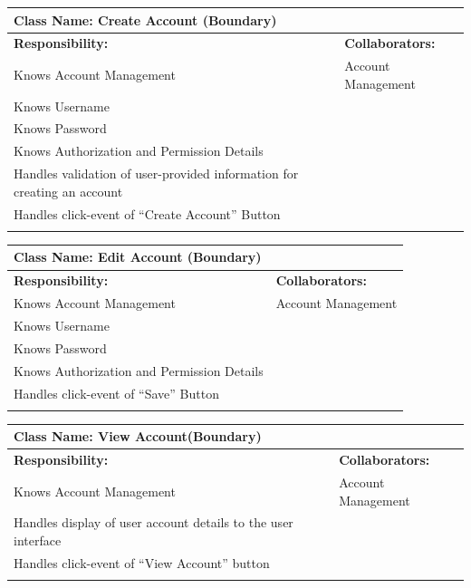 \documentclass[]{article}
\begin{document}
\begin{itemize}
	\begin{table}[ht]
		\centering
		\begin{tabular}{|p{7cm}|p{7cm}|}
		\hline 
		 \multicolumn{2}{|l|}{\textbf{Class Name:} Create Account (Boundary)} \\
		\hline
		\textbf{Responsibility:} & \textbf{Collaborators:} \\
		\hline
			Knows Account Management  & Account Management\\
			Knows Username &\\
			Knows Password &\\
			Knows Authorization and Permission Details &\\
			Handles validation of user-provided information for creating an account &\\
			Handles click-event of “Create Account” Button &\\
		\vspace{0.1in} & \\
		\hline
		\end{tabular}
	\end{table}

	\begin{table}[ht]
		\centering
		\begin{tabular}{|p{7cm}|p{7cm}|}
		\hline 
		 \multicolumn{2}{|l|}{\textbf{Class Name:} Edit Account (Boundary)} \\
		\hline
		\textbf{Responsibility:} & \textbf{Collaborators:} \\
		\hline
			Knows Account Management & Account Management\\
			Knows Username &\\
			Knows Password &\\
			Knows Authorization and Permission Details &\\
			Handles click-event of “Save” Button &\\
		\vspace{0.1in} & \\
		\hline
		\end{tabular}
	\end{table}

	\begin{table}[ht]
		\centering
		\begin{tabular}{|p{7cm}|p{7cm}|}
		\hline 
		 \multicolumn{2}{|l|}{\textbf{Class Name:} View Account(Boundary)} \\
		\hline
		\textbf{Responsibility:} & \textbf{Collaborators:} \\
		\hline
			Knows Account Management & Account Management \\
			Handles display of user account details to the user interface &\\
			Handles click-event of “View Account” button &\\
		\vspace{0.1in} & \\
		\hline
		\end{tabular}
	\end{table}


\end{itemize}
\end{document}
